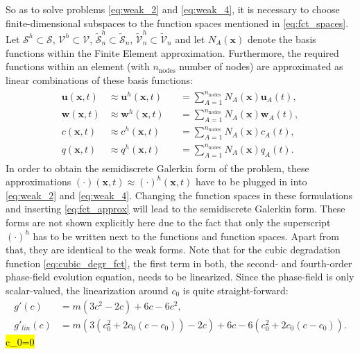 So as to solve problems \eqref{eq:weak_2} and \eqref{eq:weak_4}, it is necessary to choose finite-dimensional subspaces to the function spaces mentioned in \eqref{eq:fct_spaces}. Let $\bm{\mathcal{S}}^{h}\subset\bm{\mathcal{S}}$, $\bm{\mathcal{V}}^{h}\subset\bm{\mathcal{V}}$, $\tilde{\mathcal{S}}_{n}^{h}\subset\tilde{\mathcal{S}}_{n}$, $\tilde{\mathcal{V}}_{n}^{h}\subset\tilde{\mathcal{V}}_{n}$ and let $N_{A}\left(\mathbf{x}\right)$ denote the basis functions within the Finite Element approximation. Furthermore, the required functions within an element (with $n_{\text{nodes}}$ number of nodes) are approximated as linear combinations of these basis functions:
\begin{equation} \label{eq:fct_approx}
	\begin{aligned}
	\begin{alignedat}{2}
		\mathbf{u}\left(\mathbf{x},t\right) &\approx \mathbf{u}^{h}\left(\mathbf{x},t\right) &&= \sum\limits_{A=1}^{n_{\text{nodes}}}N_{A}\left(\mathbf{x}\right)\mathbf{u}_{A}\left(t\right), \\
		\mathbf{w}\left(\mathbf{x},t\right) &\approx \mathbf{w}^{h}\left(\mathbf{x},t\right) &&= \sum\limits_{A=1}^{n_{\text{nodes}}}N_{A}\left(\mathbf{x}\right)\mathbf{w}_{A}\left(t\right), \\
		c\left(\mathbf{x},t\right) &\approx c^{h}\left(\mathbf{x},t\right) &&= \sum\limits_{A=1}^{n_{\text{nodes}}}N_{A}\left(\mathbf{x}\right)c_{A}\left(t\right), \\
		q\left(\mathbf{x},t\right) &\approx q^{h}\left(\mathbf{x},t\right) &&= \sum\limits_{A=1}^{n_{\text{nodes}}}N_{A}\left(\mathbf{x}\right)q_{A}\left(t\right).
	\end{alignedat}
	\end{aligned}
\end{equation}
In order to obtain the semidiscrete Galerkin form of the problem, these approximations $\left(\cdot\right)\left(\mathbf{x},t\right)\approx\left(\cdot\right)^{h}\left(\mathbf{x},t\right)$ have to be plugged in into \eqref{eq:weak_2} and \eqref{eq:weak_4}. Changing the function spaces in these formulations and inserting \eqref{eq:fct_approx} will lead to the semidiscrete Galerkin form. These forms are not shown explicitly here due to the fact that only the superscript $\left(\cdot\right)^{h}$ has to be written next to the functions and function spaces. Apart from that, they are identical to the weak forms. Note that for the cubic degradation function \eqref{eq:cubic_degr_fct}, the first term in both, the second- and fourth-order phase-field evolution equation, needs to be linearized. Since the phase-field is only scalar-valued, the linearization around $c_{0}$ is quite straight-forward:
\begin{equation} \label{eq:cubic_degr_fct_lin}	
	\begin{aligned}
		g'\left(c\right) &= m\left(3c^{2}-2c\right)+6c-6c^{2}, \\
		g'_{lin}\left(c\right) &= m\left(3\left(c_{0}^{2}+2c_{0}\left(c-c_{0}\right)\right)-2c\right)+6c-6\left(c_{0}^{2}+2c_{0}\left(c-c_{0}\right)\right).
	\end{aligned}
\end{equation}
\hl{c_{0}=0}

